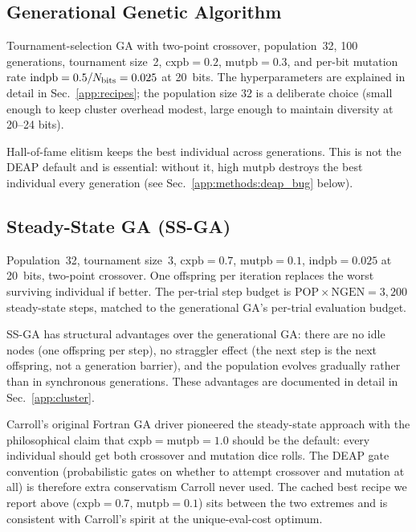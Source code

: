 \subsection{Generational Genetic Algorithm}

Tournament-selection GA with two-point crossover, population~32,
100 generations, tournament size~2, $\mathrm{cxpb} = 0.2$,
$\mathrm{mutpb} = 0.3$, and per-bit mutation rate
$\mathrm{indpb} = 0.5 / N_{\rm bits} = 0.025$ at 20~bits. The
hyperparameters are explained in detail in Sec.~\ref{app:recipes};
the population size $32$ is a deliberate choice (small enough to
keep cluster overhead modest, large enough to maintain diversity at
20--24 bits).

Hall-of-fame elitism keeps the best individual across generations.
This is not the DEAP default and is essential: without it, high
$\mathrm{mutpb}$ destroys the best individual every generation
(see Sec.~\ref{app:methods:deap_bug} below).

\subsection{Steady-State GA (SS-GA)}

Population~32, tournament size~3, $\mathrm{cxpb} = 0.7$,
$\mathrm{mutpb} = 0.1$, $\mathrm{indpb} = 0.025$ at 20~bits,
two-point crossover. One offspring per iteration replaces the
worst surviving individual if better. The per-trial step budget is
$\mathrm{POP} \times \mathrm{NGEN} = 3{,}200$ steady-state steps,
matched to the generational GA's per-trial evaluation budget.

SS-GA has structural advantages over the generational GA: there
are no idle nodes (one offspring per step), no straggler effect
(the next step is the next offspring, not a generation barrier),
and the population evolves gradually rather than in synchronous
generations. These advantages are documented in detail in
Sec.~\ref{app:cluster}.

Carroll's original Fortran GA driver \cite{CarrollGA} pioneered the
steady-state approach with the philosophical claim that
$\mathrm{cxpb} = \mathrm{mutpb} = 1.0$ should be the default: every
individual should get both crossover and mutation dice rolls. The
DEAP \cite{DEAP} gate convention (probabilistic gates on whether to
attempt crossover and mutation at all) is therefore extra
conservatism Carroll never used. The cached best recipe we report
above ($\mathrm{cxpb} = 0.7$, $\mathrm{mutpb} = 0.1$) sits between
the two extremes and is consistent with Carroll's spirit at the
unique-eval-cost optimum.

